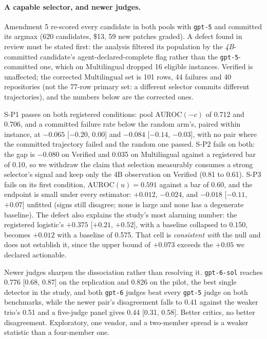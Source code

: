 \documentclass[10pt]{article}
\begin{document}
\paragraph{A capable selector, and newer judges.}\label{sec:selector}
Amendment 5 re-scored every candidate in both pools with \texttt{gpt-5} and committed its argmax (620 candidates, \$13, 59 new patches graded). A defect found in review must be stated first: the analysis filtered its population by the \emph{4B}-committed candidate's agent-declared-complete flag rather than the \texttt{gpt-5}-committed one, which on Multilingual dropped 16 eligible instances. Verified is unaffected; the corrected Multilingual set is 101 rows, 44 failures and 40 repositories (not the 77-row primary set: a different selector commits different trajectories), and the numbers below are the corrected ones.

S-P1 passes on both registered conditions: pool $\mathrm{AUROC}(-c)$ of 0.712 and 0.706, and a committed failure rate below the random arm's, paired within instance, at $-0.065$ [$-0.20$, $0.00$] and $-0.084$ [$-0.14$, $-0.03$], with no pair where the committed trajectory failed and the random one passed. S-P2 fails on both: the gap is $-0.080$ on Verified and 0.035 on Multilingual against a registered bar of 0.10, so we withdraw the claim that selection measurably consumes a strong selector's signal and keep only the 4B observation on Verified (0.81 to 0.61). S-P3 fails on its first condition, $\mathrm{AUROC}(u) = 0.591$ against a bar of 0.60, and the endpoint is small under every estimator: $+0.012$, $-0.024$, and $-0.018$ [$-0.11$, $+0.07$] unfitted (signs still disagree; none is large and none has a degenerate baseline). The defect also explains the study's most alarming number: the registered logistic's $+0.375$ [$+0.21$, $+0.52$], with a baseline collapsed to 0.150, becomes $+0.012$ with a baseline of 0.575. That cell is \emph{consistent with} the null and does not establish it, since the upper bound of $+0.073$ exceeds the $+0.05$ we declared actionable.

Newer judges sharpen the dissociation rather than resolving it. \texttt{gpt-6-sol} reaches 0.776 [0.68, 0.87] on the replication and 0.826 on the pilot, the best single detector in the study, and both \texttt{gpt-6} judges beat every \texttt{gpt-5} judge on both benchmarks, while the newer pair's disagreement falls to 0.41 against the weaker trio's 0.51 and a five-judge panel gives 0.44 [0.31, 0.58]. Better critics, no better disagreement. Exploratory, one vendor, and a two-member spread is a weaker statistic than a four-member one.
\end{document}
